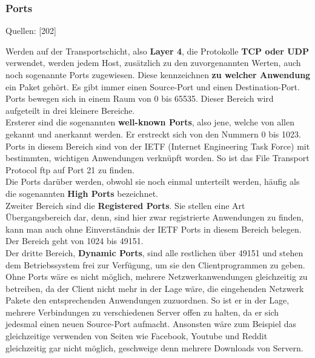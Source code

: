 \documentclass[12pt,a4paper]{report}
\begin{document}
\begin{onehalfspace}
\subsubsection{Ports}
\begin{flushright}
\begin{tiny}
Quellen: [202]
\end{tiny}
\end{flushright}
Werden auf der Transportschicht, also \textbf{Layer 4}, die Protokolle \textbf{TCP oder UDP} verwendet, werden jedem Host, zusätzlich zu den zuvorgenannten Werten, auch noch sogenannte Ports zugewiesen. Diese kennzeichnen \textbf{zu welcher Anwendung} ein Paket gehört. Es gibt immer einen Source-Port und einen Destination-Port.\\
Ports bewegen sich in einem Raum von 0 bis 65535. Dieser Bereich wird aufgeteilt in drei kleinere Bereiche.\\
Ersterer sind die sogenannten \textbf{well-known Ports}, also jene, welche von allen gekannt und anerkannt werden. Er erstreckt sich von den Nummern 0 bis 1023. Ports in diesem Bereich sind von der IETF (Internet Engineering Task Force) mit bestimmten, wichtigen Anwendungen verknüpft worden. So ist das File Transport Protocol ftp auf Port 21 zu finden.\\
Die Ports darüber werden, obwohl sie noch einmal unterteilt werden, häufig als die sogenannten \textbf{High Ports} bezeichnet.\\
Zweiter Bereich sind die \textbf{Registered Ports}. Sie stellen eine Art Übergangsbereich dar, denn, sind hier zwar registrierte Anwendungen zu finden, kann man auch ohne Einverständnis der IETF Ports in diesem Bereich belegen. Der Bereich geht von 1024 bis 49151.\\
Der dritte Bereich, \textbf{Dynamic Ports}, sind alle restlichen über 49151 und stehen dem Betriebssystem frei zur Verfügung, um sie den Clientprogrammen zu geben.\\

Ohne Ports wäre es nicht möglich, mehrere Netzwerkanwendungen gleichzeitig zu betreiben, da der Client nicht mehr in der Lage wäre, die eingehenden Netzwerk Pakete den entsprechenden Anwendungen zuzuordnen. So ist er in der Lage, mehrere Verbindungen zu verschiedenen Server offen zu halten, da er sich jedesmal einen neuen Source-Port aufmacht. Ansonsten wäre zum Beispiel das gleichzeitige verwenden von Seiten wie Facebook, Youtube und Reddit gleichzeitig gar nicht möglich, geschweige denn mehrere Downloads von Servern.\\


\end{onehalfspace}
\end{document}
